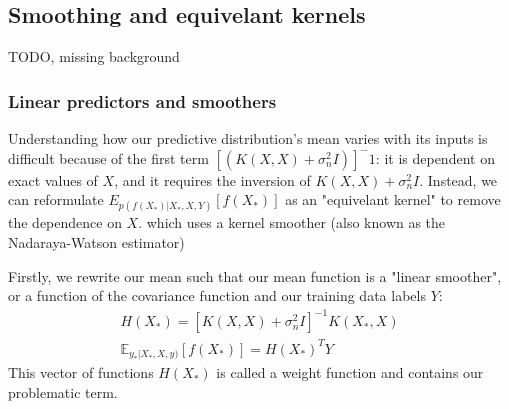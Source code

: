 \subsection{Smoothing and equivelant kernels \cite{gp-ml}}
TODO, missing background

\subsubsection{Linear predictors and smoothers}

Understanding how our predictive distribution's mean varies with its inputs is difficult because of the first term $[(K(X, X) + \sigma_n^2I)]^-1$: it is dependent on exact values of $X$, and it requires the inversion of $K(X, X) + \sigma^2_nI$. Instead, we can reformulate $E_{p(f(X_*)|X_*,X,Y)}[f(X_*)]$ as an "equivelant kernel" to remove the dependence on $X$. 
which uses a kernel smoother (also known as the Nadaraya-Watson estimator)  

Firstly, we rewrite our mean such that our mean function is a "linear smoother", or a function of the covariance function and our training data labels $Y$:
\begin{equation} \label{eq:gp_linear_smoother}
    \begin{aligned}
        H(X_*) = [K(X, X) + \sigma^2_nI]^{-1}K(X_*,X) \\
        \mathbb{E}_{y_*|X_*,X,y)}[f(X_*)] = H(X_*)^T Y
    \end{aligned}
\end{equation}
This vector of functions $H(X_*)$ is called a weight function and contains our problematic term. 

